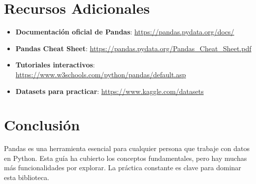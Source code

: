 \documentclass[a4paper,12pt]{article}
\begin{document}
\section{Recursos Adicionales}

\begin{itemize}
    \item \textbf{Documentación oficial de Pandas}: \url{https://pandas.pydata.org/docs/}
    \item \textbf{Pandas Cheat Sheet}: \url{https://pandas.pydata.org/Pandas_Cheat_Sheet.pdf}
    \item \textbf{Tutoriales interactivos}: \url{https://www.w3schools.com/python/pandas/default.asp}
    \item \textbf{Datasets para practicar}: \url{https://www.kaggle.com/datasets}
\end{itemize}

\section{Conclusión}
Pandas es una herramienta esencial para cualquier persona que trabaje con datos en Python. Esta guía ha cubierto los conceptos fundamentales, pero hay muchas más funcionalidades por explorar. La práctica constante es clave para dominar esta biblioteca.
\end{document}
